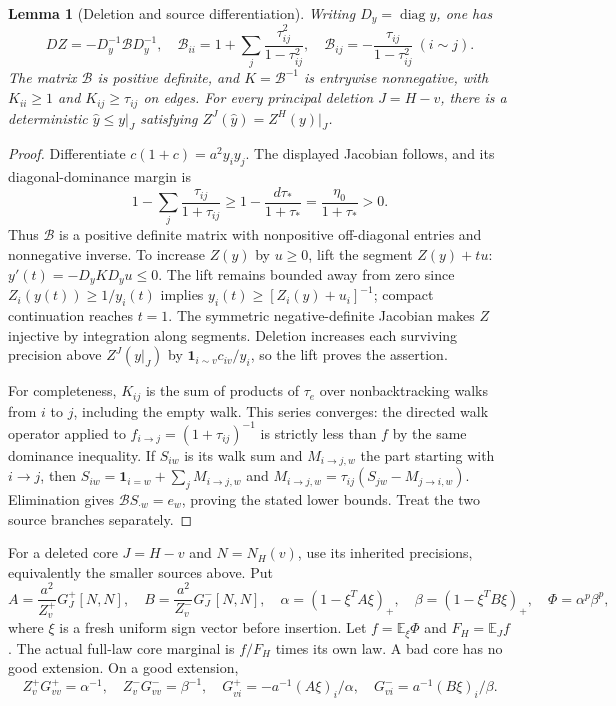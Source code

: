 \documentclass[10pt]{article}
\numberwithin{equation}{section}
\newtheorem{lemma}{Lemma}[section]
\newcommand{\1}{\mathbf1}
\begin{document}
\begin{lemma}[Deletion and source differentiation]\label{lem:fw-deletion}
Writing $D_y=\operatorname{diag}y$, one has
\[
 DZ=-D_y^{-1}\mathcal B D_y^{-1},\quad
 \mathcal B_{ii}=1+\sum_j\frac{\tau_{ij}^2}{1-\tau_{ij}^2},
 \quad \mathcal B_{ij}=-\frac{\tau_{ij}}{1-\tau_{ij}^2}\ (i\sim j).
\]
The matrix $\mathcal B$ is positive definite, and
$K=\mathcal B^{-1}$ is entrywise nonnegative, with
$K_{ii}\ge1$ and $K_{ij}\ge\tau_{ij}$ on edges.
For every principal deletion $J=H-v$, there is a deterministic
$\widehat y\le y|_J$ satisfying $Z^J(\widehat y)=Z^H(y)|_J$.
\end{lemma}
\begin{proof}
Differentiate $c(1+c)=a^2y_iy_j$. The displayed Jacobian follows,
and its diagonal-dominance margin is
\[
 1-\sum_j\frac{\tau_{ij}}{1+\tau_{ij}}
 \ge1-\frac{d\tau_*}{1+\tau_*}
 =\frac{\eta_0}{1+\tau_*}>0.
\]
Thus $\mathcal B$ is a positive definite matrix with nonpositive
off-diagonal entries and nonnegative inverse.
To increase $Z(y)$ by $u\ge0$, lift the segment $Z(y)+tu$:
$y'(t)=-D_yKD_yu\le0$.
The lift remains bounded away from zero since
$Z_i(y(t))\ge1/y_i(t)$ implies
$y_i(t)\ge[Z_i(y)+u_i]^{-1}$; compact continuation reaches $t=1$.
The symmetric negative-definite Jacobian makes $Z$ injective by
integration along segments. Deletion increases each surviving
precision above $Z^J(y|_J)$ by $\mathbf1_{i\sim v}c_{iv}/y_i$,
so the lift proves the assertion.

For completeness, $K_{ij}$ is the sum of products of $\tau_e$
over nonbacktracking walks from $i$ to $j$, including the empty
walk. This series converges: the directed walk operator applied
to $f_{i\to j}=(1+\tau_{ij})^{-1}$ is strictly less than $f$ by
the same dominance inequality. If $S_{iw}$ is its walk sum and
$M_{i\to j,w}$ the part starting with $i\to j$, then
$S_{iw}=\mathbf1_{i=w}+\sum_jM_{i\to j,w}$ and
$M_{i\to j,w}=\tau_{ij}(S_{jw}-M_{j\to i,w})$.
Elimination gives $\mathcal B S_{\cdot w}=e_w$, proving the stated
lower bounds. Treat the two source branches separately.
\end{proof}

For a deleted core $J=H-v$ and $N=N_H(v)$, use its inherited
precisions, equivalently the smaller sources above. Put
\[
 A=\frac{a^2}{Z_v^+}G_J^+[N,N],\quad
 B=\frac{a^2}{Z_v^-}G_J^-[N,N],\quad
 \alpha=(1-\xi^TA\xi)_+,\quad\beta=(1-\xi^TB\xi)_+,
 \quad\Phi=\alpha^p\beta^p,
\]
where $\xi$ is a fresh uniform sign vector before insertion.
Let $f=\mathbb E_\xi\Phi$ and $F_H=\mathbb E_J f$.
The actual full-law core marginal is $f/F_H$ times its own law.
A bad core has no good extension. On a good extension,
\[
 Z_v^+G^+_{vv}=\alpha^{-1},\quad Z_v^-G^-_{vv}=\beta^{-1},\quad
 G^+_{vi}=-a^{-1}(A\xi)_i/\alpha,\quad
 G^-_{vi}=a^{-1}(B\xi)_i/\beta.                 \tag{F1}\label{eq:fw-schur}
\]
\end{document}
